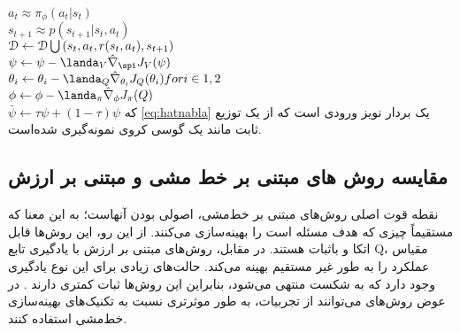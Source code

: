 $a_t \approx \pi_\phi(a_t|s_t)$ \\
$s_{t+1} \approx p(s_{t+1}|s_t,a_t)$\\
$\EuScript{D}\leftarrow \EuScript{D} \bigcup {(s_t,a_t,r(s_t,a_t),s_{t+1})}$ \\
$\psi \leftarrow \psi - \landa_V \hat{\nabla}_\spi J_V (\psi)$ \\
$\theta_i \leftarrow \theta_i - \landa_Q \hat{\nabla}_{\theta_i} J_Q(\theta_i) for i \in {1,2}$\\
$\phi \leftarrow \phi - \landa_\pi \hat{\nabla}_\phi J_\pi (Q)$ \\
$\bar{\psi} \leftarrow \tau \psi + (1-\tau) \psi$
که \ref{eq:hatnabla} یک بردار نویز ورودی است که از یک توزیع ثابت مانند یک گوسی کروی نمونه‌گیری شده‌است.
\subsection{مقایسه روش های مبتنی بر خط مشی و مبتنی بر ارزش}
نقطه قوت اصلی روش‌های مبتنی بر خط‌مشی، اصولی بودن آنهاست؛ به این معنا که مستقیماً چیزی که هدف مسئله است را بهینه‌سازی می‌کنند. از این رو، این روش‌ها قابل اتکا و باثبات هستند. در مقابل، روش‌های مبتنی بر ارزش
با یادگیری تابع Q، مقیاس عملکرد را به طور غیر مستقیم بهینه می‌کند. حالت‌های زیادی برای این نوع یادگیری وجود دارد که به شکست منتهی می‌شود، بنابراین این روش‌ها  ثبات کمتری دارند 
\cite{suttonbook}.
در عوض روش‌های 
 می‌توانند از تجربیات، به طور موثرتری نسبت به تکنیک‌های بهینه‌سازی خط‌مشی استفاده کنند.



